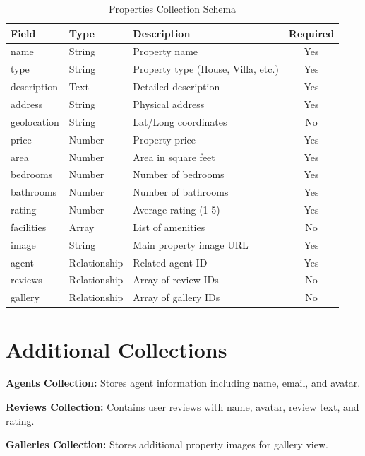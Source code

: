 \documentclass[11pt,a4paper,oneside]{book}
\begin{document}
\begin{table}[h]
\small
\centering
\begin{tabularx}{\textwidth}{l l X c}
\toprule
\textbf{Field} & \textbf{Type} & \textbf{Description} & \textbf{Required} \\
\midrule
name & String & Property name & Yes \\
type & String & Property type (House, Villa, etc.) & Yes \\
description & Text & Detailed description & Yes \\
address & String & Physical address & Yes \\
geolocation & String & Lat/Long coordinates & No \\
price & Number & Property price & Yes \\
area & Number & Area in square feet & Yes \\
bedrooms & Number & Number of bedrooms & Yes \\
bathrooms & Number & Number of bathrooms & Yes \\
rating & Number & Average rating (1-5) & Yes \\
facilities & Array & List of amenities & No \\
image & String & Main property image URL & Yes \\
agent & Relationship & Related agent ID & Yes \\
reviews & Relationship & Array of review IDs & No \\
gallery & Relationship & Array of gallery IDs & No \\
\bottomrule
\end{tabularx}
\caption{Properties Collection Schema}
\end{table}

\section{Additional Collections}

\begin{definitionbox}
\textbf{Agents Collection:} Stores agent information including name, email, and avatar.

\textbf{Reviews Collection:} Contains user reviews with name, avatar, review text, and rating.

\textbf{Galleries Collection:} Stores additional property images for gallery view.
\end{definitionbox}

\end{document}
